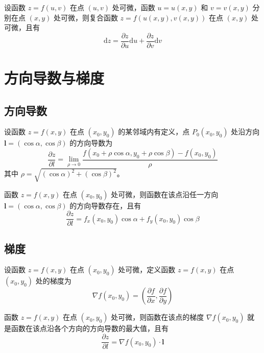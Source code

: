 \begin{theorem}
    设函数 $z=f(u,v)$ 在点 $(u,v)$ 处可微，函数 $u=u(x,y)$ 和 $v=v(x,y)$ 分别在点 $(x,y)$ 处可微，则复合函数 $z=f(u(x,y),v(x,y))$ 在点 $(x,y)$ 处可微，且有
    \[
        \mathrm{d}z=\frac{\partial z}{\partial u}\mathrm{d}u+\frac{\partial z}{\partial v}\mathrm{d}v
    \]
\end{theorem}

\section{方向导数与梯度}

\subsection{方向导数}

\begin{definition}
    设函数 $z=f(x,y)$ 在点 $(x_0,y_0)$ 的某邻域内有定义，点 $P_0(x_0,y_0)$ 处沿方向 $\bm{l}=(\cos\alpha,\cos\beta)$ 的方向导数为
    \[
        \frac{\partial z}{\partial l}=\lim_{\rho\to 0}\frac{f(x_0+\rho\cos\alpha,y_0+\rho\cos\beta)-f(x_0,y_0)}{\rho}
    \]
    其中 $\rho=\sqrt{(\cos\alpha)^2+(\cos\beta)^2}$。
\end{definition}

\begin{theorem}
    函数 $z=f(x,y)$ 在点 $(x_0,y_0)$ 处可微，则函数在该点沿任一方向 $\bm{l}=(\cos\alpha,\cos\beta)$ 的方向导数存在，且有
    \[
        \frac{\partial z}{\partial l}=f_x(x_0,y_0)\cos\alpha+f_y(x_0,y_0)\cos\beta
    \]
\end{theorem}

\subsection{梯度}

\begin{definition}
    设函数 $z=f(x,y)$ 在点 $(x_0,y_0)$ 处可微，定义函数 $z=f(x,y)$ 在点 $(x_0,y_0)$ 处的梯度为
    \[
        \nabla f(x_0,y_0)=\left(\frac{\partial f}{\partial x},\frac{\partial f}{\partial y}\right)
    \]
\end{definition}

\begin{theorem}
    函数 $z=f(x,y)$ 在点 $(x_0,y_0)$ 处可微，则函数在该点的梯度 $\nabla f(x_0,y_0)$ 就是函数在该点沿各个方向的方向导数的最大值，且有
    \[
        \frac{\partial z}{\partial l}=\nabla f(x_0,y_0)\cdot\bm{l}
    \]
\end{theorem}

